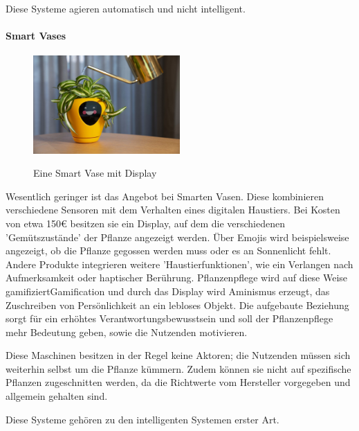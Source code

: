 Diese Systeme agieren automatisch und nicht intelligent.

\paragraph{Smart Vases}
\begin{figure}[H]
\centering
\includegraphics[width=0.5\textwidth]{images/Lua.jpg}
\caption{Eine Smart Vase mit Display}\cite{lua}
\label{fig:smartVase}
\end{figure}

Wesentlich geringer ist das Angebot bei Smarten Vasen. Diese kombinieren verschiedene Sensoren mit dem Verhalten eines digitalen Haustiers. Bei Kosten von etwa 150€\cite{lyeva_amazon} besitzen sie ein Display, auf dem die verschiedenen 'Gemütszustände' der Pflanze angezeigt werden. Über Emojis wird beispielsweise angezeigt, ob die Pflanze gegossen werden muss oder es an Sonnenlicht fehlt. Andere Produkte integrieren weitere 'Haustierfunktionen', wie ein Verlangen nach Aufmerksamkeit oder haptischer Berührung. Pflanzenpflege wird auf diese Weise gamifiziert\gls{Gamification} und durch das Display wird Aminismus erzeugt, das Zuschreiben von Persönlichkeit an ein lebloses Objekt. Die aufgebaute Beziehung sorgt für ein erhöhtes Verantwortungsbewusstsein\cite{lawton_tamagotchi_2017} und soll der Pflanzenpflege mehr Bedeutung geben, sowie die Nutzenden motivieren. 

Diese Maschinen besitzen in der Regel keine Aktoren; die Nutzenden müssen sich weiterhin selbst um die Pflanze kümmern. Zudem können sie nicht auf spezifische Pflanzen zugeschnitten werden, da die Richtwerte vom Hersteller vorgegeben und allgemein gehalten sind.

Diese Systeme gehören zu den intelligenten Systemen erster Art.

